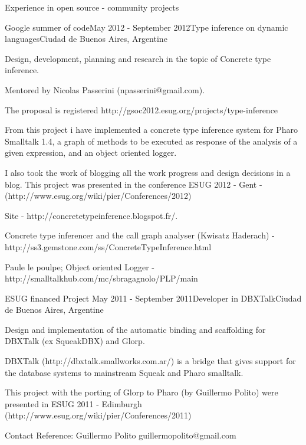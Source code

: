 \documentclass{resume} %
\begin{document}
\begin{rSection}{Experience in open source - community projects}
\begin{rSubsection}{Google summer of code}{May 2012 - September 2012}{Type inference on dynamic languages}{Ciudad de Buenos Aires, Argentine}
	\item Design, development, planning and research in the topic of Concrete type inference. 		
	\item Mentored by Nicolas Passerini (npasserini@gmail.com).
	\item The proposal is registered http://gsoc2012.esug.org/projects/type-inference 
	\item From this project i have implemented a concrete type inference system for Pharo Smalltalk 1.4, a graph of methods to be executed as response of the analysis of a given expression,  and an object oriented logger. 
	\item I also took the work of blogging all the work progress and design decisions in a blog. This project was presented in the conference ESUG 2012 - Gent - (http://www.esug.org/wiki/pier/Conferences/2012) 
	\item Site - http://concretetypeinference.blogspot.fr/. 
	\item Concrete type inferencer and the call graph analyser (Kwisatz Haderach) - http://ss3.gemstone.com/ss/ConcreteTypeInference.html
	\item Paule le poulpe; Object oriented Logger - http://smalltalkhub.com/mc/sbragagnolo/PLP/main
\end{rSubsection}

 
\begin{rSubsection}{ESUG financed Project}{ May 2011 - September 2011}{Developer in DBXTalk}{Ciudad de Buenos Aires, Argentine}
	\item Design and implementation of the automatic binding and scaffolding for DBXTalk (ex SqueakDBX) and Glorp.
	\item DBXTalk (http://dbxtalk.smallworks.com.ar/) is a bridge that gives support for the  database systems to mainstream Squeak and Pharo smalltalk. 
	\item This project with the porting of Glorp to Pharo (by Guillermo Polito) were presented in ESUG 2011 - Edimburgh (http://www.esug.org/wiki/pier/Conferences/2011)
	\item Contact Reference: Guillermo Polito guillermopolito@gmail.com
\end{rSubsection}


\end{rSection}
\end{document}
